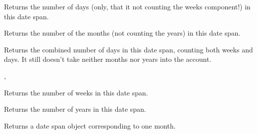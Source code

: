 
Returns the number of days (only, that it not counting the weeks component!)
in this date span.



\label{wxdatespangetmonths}


Returns the number of the months (not counting the years) in this date span.

\label{wxdatespangettotaldays}


Returns the combined number of days in this date span, counting both weeks and
days. It still doesn't take neither months nor years into the account.


, 

\label{wxdatespangetweeks}


Returns the number of weeks in this date span.



\label{wxdatespangetyears}


Returns the number of years in this date span.

\label{wxdatespanmonth}


Returns a date span object corresponding to one month.



\label{wxdatespanmonths}


